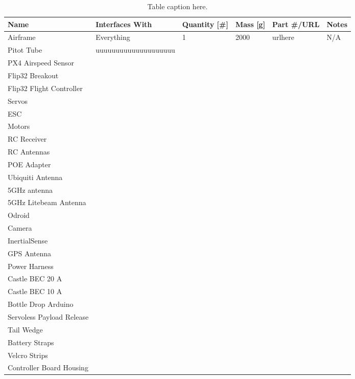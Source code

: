 \documentclass[]{auvsi_doc}
\begin{document}
\begin{table}[h!]
	\begin{center}
		\caption{Table caption here.}
		\label{table:BOM}
		\begin{tabularx}{\textwidth}{l l l l l l}
			\toprule
			Name & Interfaces With & Quantity [\#] & Mass [g] & Part \#/URL & Notes \\
			\midrule
			Airframe & Everything & 1 & 2000 & urlhere & N/A \\
			Pitot Tube &   uuuuuuuuuuuuuuuuuuuu &   &   &   &   \\
			PX4 Airspeed Sensor  &   &   &   &   &   \\
			Flip32 Breakout  &   &   &   &   &   \\
			Flip32 Flight Controller  &   &   &   &   &   \\
			Servos  &   &   &   &   &   \\ 
			ESC  &   &   &   &   &   \\
			Motors  &   &   &   &   &   \\ 
			RC Receiver  &   &   &   &   &   \\
			RC Antennas  &   &   &   &   &   \\
			POE Adapter  &   &   &   &   &   \\
			Ubiquiti Antenna  &   &   &   &   &   \\ 
			5GHz antenna  &   &   &   &   &   \\
			5GHz Litebeam Antenna  &   &   &   &   &   \\
			Odroid  &   &   &   &   &   \\
			Camera  &   &   &   &   &   \\
			InertialSense  &   &   &   &   &   \\
			GPS Antenna  &   &   &   &   &   \\ 
			Power Harness  &   &   &   &   &   \\
			Castle BEC 20 A  &   &   &   &   &   \\
			Castle BEC 10 A  &   &   &   &   &   \\
			Bottle Drop Arduino  &   &   &   &   &   \\
			Servoless Payload Release  &   &   &   &   &   \\
			Tail Wedge  &   &   &   &   &   \\ 
			Battery Straps  &   &   &   &   &   \\
			Velcro Strips  &   &   &   &   &   \\
			Controller Board Housing  &   &   &   &   &   \\

\end{tabularx}
\end{center}
\end{table}
\end{document}
